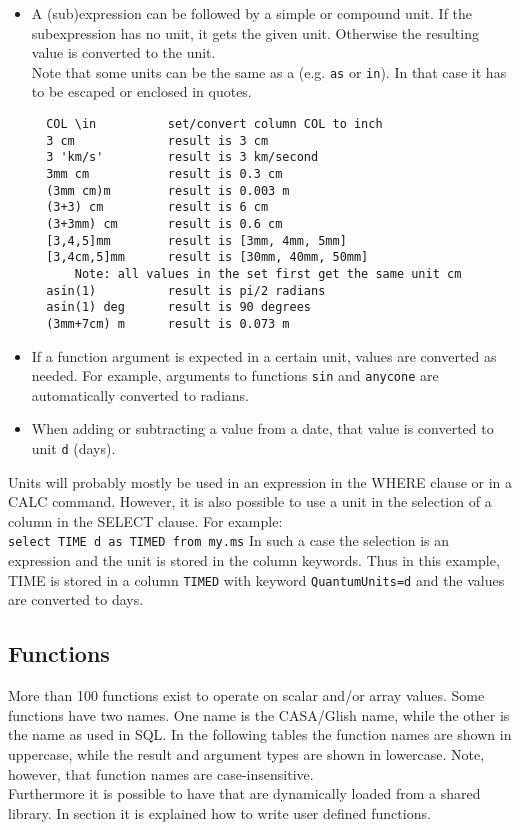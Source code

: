 \begin{itemize}
 \item A (sub)expression can be followed by a simple or compound unit.
       If the subexpression has no unit, it gets the given unit.
       Otherwise the resulting value is converted to the unit.
       \\Note that some units can be the same as a
       (e.g. \texttt{as} or \texttt{in}).
       In that case it has to be escaped or enclosed in quotes.
\begin{verbatim}
  COL \in          set/convert column COL to inch
  3 cm             result is 3 cm
  3 'km/s'         result is 3 km/second
  3mm cm           result is 0.3 cm
  (3mm cm)m        result is 0.003 m
  (3+3) cm         result is 6 cm
  (3+3mm) cm       result is 0.6 cm
  [3,4,5]mm        result is [3mm, 4mm, 5mm]
  [3,4cm,5]mm      result is [30mm, 40mm, 50mm]
      Note: all values in the set first get the same unit cm
  asin(1)          result is pi/2 radians
  asin(1) deg      result is 90 degrees
  (3mm+7cm) m      result is 0.073 m
\end{verbatim}
 \item If a function argument is expected in a certain unit, values
	are converted as needed. For example, arguments to functions 
	\texttt{sin} and \texttt{anycone}
	are automatically converted to radians.
 \item When adding or subtracting a value from a date, that value is
	converted to unit \texttt{d} (days).
\end{itemize}
Units will probably mostly be used in an expression in the WHERE
clause or in a CALC command. However, it is also possible to use a
unit in the selection of a column in the SELECT clause. For example:
\\\texttt{select TIME d as TIMED from my.ms}
In such a case the selection is an expression and the unit is stored
in the column keywords. Thus in this example, TIME is stored in a
column \texttt{TIMED} with keyword \texttt{QuantumUnits=d} and the 
values are converted to days.

\subsection{\label{TAQL:FUNCTIONS}Functions}
More than 100 functions exist to operate on scalar and/or array values.
Some functions have two names. One name is the CASA/Glish name, while the
other is the name as used in SQL.
In the following tables the function names are shown in uppercase,
while the result and argument types are shown in lowercase.
Note, however, that function names are case-insensitive.
\\Furthermore it is possible to have 
that are dynamically loaded from a shared library. In section
 it is
explained how to write user defined functions.

